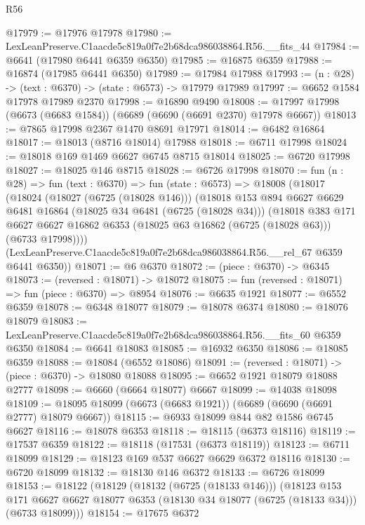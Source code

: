 \begin{lexlean}{R56}
\begin{coremodule}
@17979 := @17976 @17978
@17980 := LexLeanPreserve.C1aacde5c819a0f7e2b68dca986038864.R56.__fits_44
@17984 := @6641 (@17980 @6441 @6359 @6350)
@17985 := @16875 @6359
@17988 := @16874 (@17985 @6441 @6350)
@17989 := @17984 @17988
@17993 := (n : @28) -> (text : @6370) -> (state : @6573) -> @17979 @17989
@17997 := @6652 @1584 @17978 @17989 @2370
@17998 := @16890 @9490
@18008 := @17997 @17998 (@6673 (@6683 @1584)) (@6689 (@6690 (@6691 @2370) @17978 @6667))
@18013 := @7865 @17998 @2367 @1470 @8691 @17971
@18014 := @6482 @16864
@18017 := @18013 (@8716 @18014) @17988
@18018 := @6711 @17998
@18024 := @18018 @169 @1469 @6627 @6745 @8715 @18014
@18025 := @6720 @17998
@18027 := @18025 @146 @8715
@18028 := @6726 @17998
@18070 := fun (n : @28) =>
  fun (text : @6370) =>
  fun (state : @6573) =>
  @18008
    (@18017
      (@18024
        (@18027 (@6725 (@18028 @146)))
        (@18018
          @153
          @894
          @6627
          @6629
          @6481
          @16864
          (@18025 @34 @6481 (@6725 (@18028 @34)))
          (@18018
            @383
            @171
            @6627
            @6627
            @16862
            @6353
            (@18025 @63 @16862 (@6725 (@18028 @63)))
            (@6733 @17998))))
      (LexLeanPreserve.C1aacde5c819a0f7e2b68dca986038864.R56.__rel_67 @6359 @6441 @6350))
@18071 := @6 @6370
@18072 := (piece : @6370) -> @6345
@18073 := (reversed : @18071) -> @18072
@18075 := fun (reversed : @18071) => fun (piece : @6370) => @8954
@18076 := @6635 @1921
@18077 := @6552 @6359
@18078 := @6348 @18077
@18079 := @18078 @6374
@18080 := @18076 @18079
@18083 := LexLeanPreserve.C1aacde5c819a0f7e2b68dca986038864.R56.__fits_60 @6359 @6350
@18084 := @6641 @18083
@18085 := @16932 @6350
@18086 := @18085 @6359
@18088 := @18084 (@6552 @18086)
@18091 := (reversed : @18071) -> (piece : @6370) -> @18080 @18088
@18095 := @6652 @1921 @18079 @18088 @2777
@18098 := @6660 (@6664 @18077) @6667
@18099 := @14038 @18098
@18109 := @18095 @18099 (@6673 (@6683 @1921)) (@6689 (@6690 (@6691 @2777) @18079 @6667))
@18115 := @6933 @18099 @844 @82 @1586 @6745 @6627
@18116 := @18078 @6353
@18118 := @18115 (@6373 @18116)
@18119 := @17537 @6359
@18122 := @18118 (@17531 (@6373 @18119))
@18123 := @6711 @18099
@18129 := @18123 @169 @537 @6627 @6629 @6372 @18116
@18130 := @6720 @18099
@18132 := @18130 @146 @6372
@18133 := @6726 @18099
@18153 := @18122
    (@18129
      (@18132 (@6725 (@18133 @146)))
      (@18123
        @153
        @171
        @6627
        @6627
        @18077
        @6353
        (@18130 @34 @18077 (@6725 (@18133 @34)))
        (@6733 @18099)))
@18154 := @17675 @6372

\end{coremodule}
\end{lexlean}

